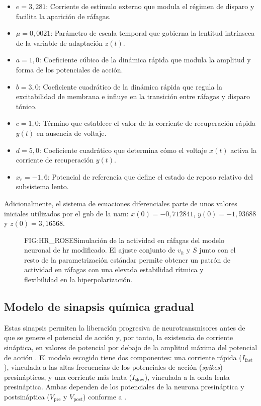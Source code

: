 \begin{itemize}
    \item $e = 3{,}281$: Corriente de estímulo externo que modula el régimen de disparo y facilita la aparición de ráfagas.
    \item $\mu = 0{,}0021$: Parámetro de escala temporal que gobierna la lentitud intrínseca de la variable de adaptación $z(t)$.
    \item $a = 1{,}0$: Coeficiente cúbico de la dinámica rápida que modula la amplitud y forma de los potenciales de acción.
    \item $b = 3{,}0$: Coeficiente cuadrático de la dinámica rápida que regula la excitabilidad de membrana e influye en la transición entre ráfagas y disparo tónico.
    \item $c = 1{,}0$: Término que establece el valor de la corriente de recuperación rápida $y(t)$ en ausencia de voltaje.
    \item $d = 5{,}0$: Coeficiente cuadrático que determina cómo el voltaje $x(t)$ activa la corriente de recuperación $y(t)$.
    \item $x_r = -1{,}6$: Potencial de referencia que define el estado de reposo relativo del subsistema lento.
\end{itemize}

Adicionalmente, el sistema de ecuaciones diferenciales parte de unos valores iniciales utilizados por el \ac{gnb} de la \ac{uam}: $x(0) = -0{,}712841$, $y(0) = -1{,}93688$ y $z(0) = 3{,}16568$.

\begin{figure}[Dinámica de la neurona de \acl{hr} modificada]{FIG:HR_ROSE}{Simulación de la actividad en ráfagas del modelo neuronal de \ac{hr} modificado. El ajuste conjunto de $v_h$ y $S$ junto con el resto de la parametrización estándar permite obtener un patrón de actividad en ráfagas con una elevada estabilidad rítmica y flexibilidad en la hiperpolarización.}
\end{figure}


\subsection{Modelo de sinapsis química gradual\label{SUBSEC:SINAPSIS_QUIMICA}}

Estas sinapsis permiten la liberación progresiva de neurotransmisores antes de que se genere el potencial de acción y, por tanto, la existencia de corriente sináptica, en valores de potencial por debajo de la amplitud máxima del potencial de acción \cite{Golowasch1999}. El modelo escogido tiene dos componentes: una corriente rápida (\(I_{\mathrm{fast}}\)), vinculada a las altas frecuencias de los potenciales de acción (\textit{spikes}) presinápticos, y una corriente más lenta (\(I_{\mathrm{slow}}\)), vinculada a la onda lenta presináptica. Ambas dependen de los potenciales de la neurona presináptica y postsináptica (\(V_{\mathrm{pre}}\) y \(V_{\mathrm{post}}\)) conforme a \cite{Golowasch1999}.

